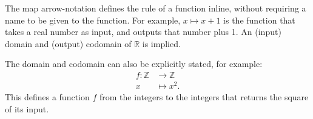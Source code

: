 The map arrow-notation defines the rule of a function inline, 
without requiring a name to be given to the function. 
For example, 
\(x\mapsto x+1\) is the function that takes a real number as input, 
and outputs that number plus 1. 
An (input) domain and (output) codomain of \(\mathbb{R}\) is implied.

The domain and codomain can also be explicitly stated, 
for example:
\begin{align}
f : \mathbb{Z} & \rightarrow \mathbb{Z}\\
x &\mapsto x^2.
\end{align}
This defines a function \(f\) from the integers to the integers that returns the square of its input.


